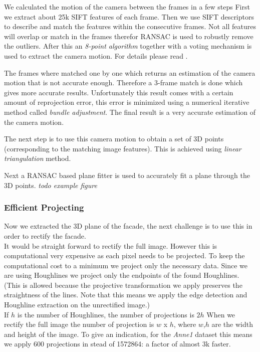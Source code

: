 We calculated the motion of the camera between the frames in a few steps
First we extract about 25k SIFT features of each frame.  Then we use
SIFT descriptors to describe and match the features within the consecutive
frames.  Not all features will overlap or match in the frames therefor RANSAC is used to
robustly remove the outliers.  After this an \emph{8-point algorithm} together with a
voting mechanism is used to extract the camera motion. For details please read
\cite{Fit3d}.

The frames where matched one by one which returns an estimation of the camera
motion that is not accurate enough.  Therefore a 3-frame match is done which
gives more accurate results.  Unfortunately this result comes with a certain
amount of reprojection error, this error is minimized using a numerical
iterative method called \emph{bundle adjustment}.  The final result is a very
accurate estimation of the camera motion.

The next step is to use this camera motion to obtain a set of 3D points
(corresponding to the matching image features).  This is achieved using \emph{linear triangulation}
method. 

Next a RANSAC based plane fitter is used to accurately fit a plane through
the 3D points. 
\emph{todo example figure}

\subsubsection{Efficient Projecting} 
Now we extracted the 3D plane of the facade, the next challenge is to use this
in order to rectify the facade.\\

It would be straight forward to rectify the full image. However this is
computational very expensive as each pixel needs to be projected. To keep the
computational cost to a minimum we project only the necessary data. Since we
are using Houghlines we project only the endpoints of the found Houghlines. 
(This is allowed because the projective transformation we apply preserves the
straightness of the lines. Note that this means we apply the edge detection and
Houghline extraction on the unrectified image.)\\

If $h$ is the number of Houghlines, the number of projections is $2h$
When we rectify the full image the number of projection is $w$ x $h$, where $w$,$h$ are the width and height of
the image. To give an indication, for the \emph{Anne1} dataset 
this means we apply 600 projections in stead of 1572864: a factor of almost 3k faster.\\

